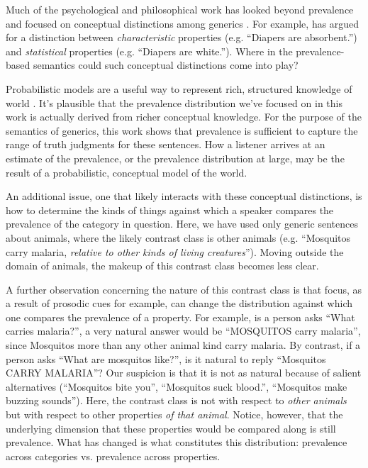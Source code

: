 \documentclass[10pt,letterpaper]{article}
\begin{document}
Much of the psychological and philosophical work has looked beyond prevalence and focused on conceptual distinctions among generics \cite{Prasada2013, Leslie2008}. For example, \citeauthor{Prasada2013} has argued for a distinction between \emph{characteristic} properties (e.g. ``Diapers are absorbent.'') and \emph{statistical} properties (e.g. ``Diapers are white.''). Where in the prevalence-based semantics could such conceptual distinctions come into play?

Probabilistic models are a useful way to represent rich, structured knowledge of world \cite{Goodmanconcepts}. It's plausible that the prevalence distribution we've focused on in this work is actually derived from richer conceptual knowledge. For the purpose of the semantics of generics, this work shows that prevalence is sufficient to capture the range of truth judgments for these sentences. How a listener arrives at an estimate of the prevalence, or the prevalence distribution at large, may be the result of a probabilistic, conceptual model of the world. 

An additional issue, one that likely interacts with these conceptual distinctions, is how to determine the kinds of things against which a speaker compares the prevalence of the category in question. Here, we have used only generic sentences about animals, where the likely contrast class is other animals (e.g. ``Mosquitos carry malaria, \emph{relative to other kinds of living creatures}''). Moving outside the domain of animals, the makeup of this contrast class becomes less clear. 

A further observation concerning the nature of this contrast class is that focus, as a result of prosodic cues for example, can change the distribution against which one compares the prevalence of a property. For example, is a person asks ``What carries malaria?'', a very natural answer would be ``MOSQUITOS carry malaria'', since Mosquitos more than any other animal kind carry malaria. By contrast, if a person asks ``What are mosquitos like?'', is it natural to reply ``Mosquitos CARRY MALARIA''? 
Our suspicion is that it is not as natural because of salient alternatives (``Mosquitos bite you'', ``Mosquitos suck blood.'', ``Mosquitos make buzzing sounds''). 
Here, the contrast class is not with respect to \emph{other animals} but with respect to other properties \emph{of that animal}. 
Notice, however, that the underlying dimension that these properties would be compared along is still prevalence. What has changed is what constitutes this distribution: prevalence across categories vs. prevalence across properties.
\end{document}

